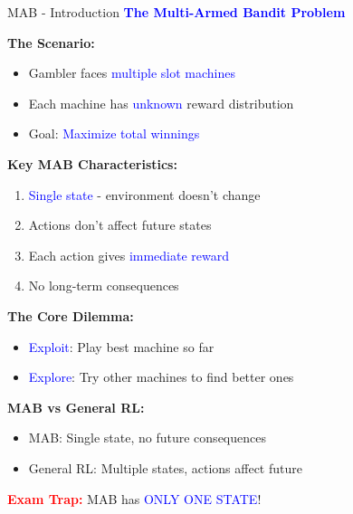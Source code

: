 \documentclass[8pt]{beamer}
\begin{document}

\begin{frame}{MAB - Introduction}
\fontsize{6.5}{7.5}\selectfont
\textcolor{blue}{\textbf{The Multi-Armed Bandit Problem}}

\textbf{The Scenario:}
\begin{itemize}
\item Gambler faces \textcolor{blue}{multiple slot machines}
\item Each machine has \textcolor{blue}{unknown} reward distribution
\item Goal: \textcolor{blue}{Maximize total winnings}
\end{itemize}

\textbf{Key MAB Characteristics:}
\begin{enumerate}
\item \textcolor{blue}{Single state} - environment doesn't change
\item Actions don't affect future states
\item Each action gives \textcolor{blue}{immediate reward}
\item No long-term consequences
\end{enumerate}

\textbf{The Core Dilemma:}
\begin{itemize}
\item \textcolor{blue}{Exploit}: Play best machine so far
\item \textcolor{blue}{Explore}: Try other machines to find better ones
\end{itemize}

\textbf{MAB vs General RL:}
\begin{itemize}
\item MAB: Single state, no future consequences
\item General RL: Multiple states, actions affect future
\end{itemize}

\textcolor{red}{\textbf{Exam Trap:}} MAB has \textcolor{blue}{ONLY ONE STATE}!
\end{frame}
\end{document}
